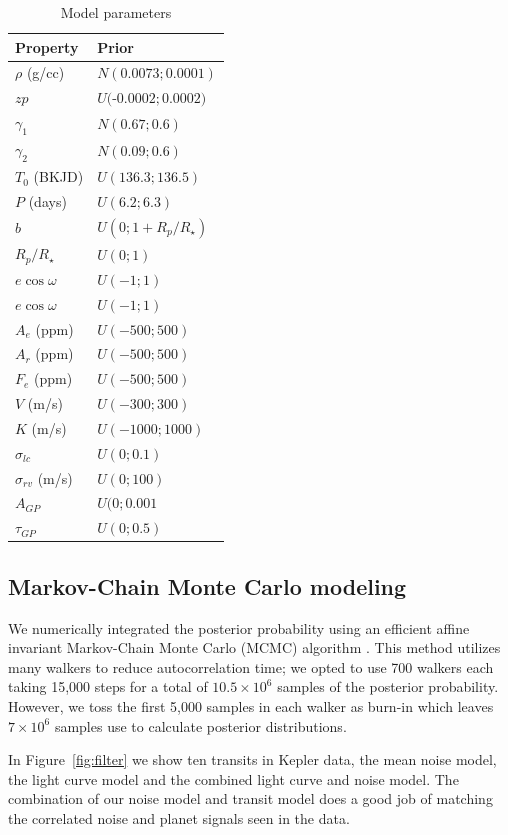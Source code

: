 \documentclass[apjl]{emulateapj}
\begin{document}
\begin{table}
\centering
\caption{Model parameters}\label{tab:priors}
\begin{tabular}{l l }
Property & Prior \\
\hline
$\rho$ (g/cc)		&	$N(0.0073;0.0001)$ \\
$zp$				& 	$U($-$0.0002;0.0002)$\\
$\gamma_1$		&	$N(0.67;0.6)$ \\
$\gamma_2$		&	$N(0.09;0.6)$\\
$T_0$ (BKJD)& $U(136.3;136.5)$\\
$P$ (days) & $U(6.2;6.3)$\\
$b$ & $U(0;1+R_{p}/R_{\star})$\\
$R_{p}/R_{\star}$ & $U(0;1)$ \\
$e\cos{\omega}$ &$U(-1;1)$ \\
$e\cos{\omega}$ & $U(-1;1)$\\
$A_e$ (ppm)&$U(-500;500)$ \\
$A_r$ (ppm)& $U(-500;500)$\\
$F_e$ (ppm)& $U(-500;500)$\\
$V$ (m/s)&$U(-300;300)$ \\
$K$ (m/s)&$U(-1000;1000)$ \\
$\sigma_{lc}$ & $U(0;0.1)$\\
$\sigma_{rv}$ (m/s)&$U(0;100)$ \\
$A_{GP}$ &  $U(0;0.001$ \\
$\tau_{GP}$ &  $U(0;0.5)$ \\
\hline
\end{tabular}
\end{table}

\subsection{Markov-Chain Monte Carlo modeling}
We numerically integrated the posterior probability using an efficient affine invariant Markov-Chain Monte Carlo (MCMC) algorithm \citep{goodman10,foreman13}.  This method utilizes many walkers to reduce autocorrelation time; we opted to use 700 walkers each taking 15,000 steps for a total of $10.5\times10^6$ samples of the posterior probability. However, we toss the first 5,000 samples in each walker as burn-in which leaves $7\times10^6$ samples use to calculate posterior distributions.

In Figure~\ref{fig:filter} we show ten transits in Kepler data, the mean noise model, the light curve model and the combined light curve and noise model. The combination of our noise model and transit model does a good job of matching the correlated noise and planet signals seen in the data.
\end{document}
